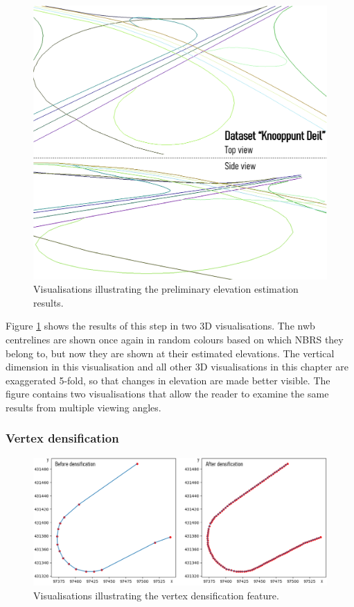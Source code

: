 \begin{figure}
    \centering
    \includegraphics[width=\linewidth]{final_report/figs/elevationestimation0.png}
    \caption{Visualisations illustrating the preliminary elevation estimation results.}
    \label{fig:elevationestimation0}
\end{figure}

Figure \ref{fig:elevationestimation0} shows the results of this step in two 3D visualisations. The \ac{nwb} centrelines are shown once again in random colours based on which NBRS they belong to, but now they are shown at their estimated elevations. The vertical dimension in this visualisation and all other 3D visualisations in this chapter are exaggerated 5-fold, so that changes in elevation are made better visible. The figure contains two visualisations that allow the reader to examine the same results from multiple viewing angles.

\subsubsection{Vertex densification}

\begin{figure}
    \centering
    \includegraphics[width=\linewidth]{final_report/figs/elevationestimation1.png}
    \caption{Visualisations illustrating the vertex densification feature.}
    \label{fig:elevationestimation1}
\end{figure}

